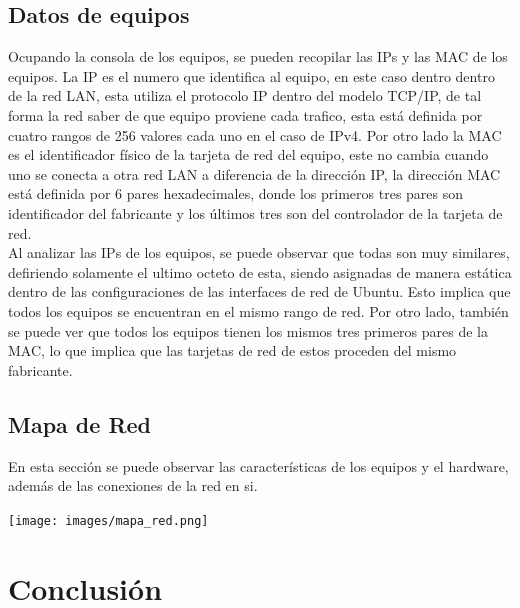 ﻿\documentclass[spanish]{udpreport}
\begin{document}
\section{Datos de equipos}
Ocupando la consola de los equipos, se pueden recopilar las IPs y las MAC de los equipos. La IP es el numero que identifica al equipo, en este caso dentro dentro de la red LAN, esta utiliza el protocolo IP dentro del modelo TCP/IP, de tal forma la red saber de que equipo proviene cada trafico, esta está definida por cuatro rangos de 256 valores cada uno en el caso de IPv4. Por otro lado la MAC es el identificador físico de la tarjeta de red del equipo, este no cambia cuando uno se conecta a otra red LAN a diferencia de la dirección IP, la dirección MAC está definida por 6 pares hexadecimales, donde los primeros tres pares son identificador del fabricante y los últimos tres son del controlador de la tarjeta de red.
\\

\setlength{\parindent}{0.5cm} Al analizar las IPs de los equipos, se puede observar que todas son muy similares, defiriendo solamente el ultimo octeto de esta, siendo asignadas de manera estática dentro de las configuraciones de las interfaces de red de Ubuntu. Esto implica que todos los equipos se encuentran en el mismo rango de red. Por otro lado, también se puede ver que todos los equipos tienen los mismos tres primeros pares de la MAC, lo que implica que las tarjetas de red de estos proceden del mismo fabricante.



\pagebreak
\section{Mapa de Red}
En esta sección se puede observar las características de los equipos y el hardware, además de las conexiones de la red en si. 
\begin{center}
	\texttt{[image: images/mapa\_red.png]} 
\end{center}

\listoffigures

\chapter{Conclusión}
\end{document}
